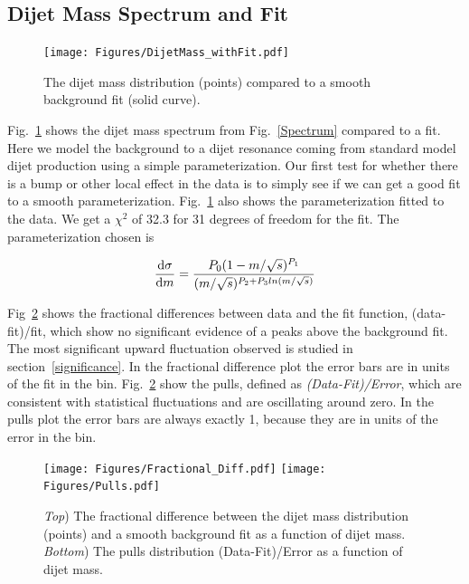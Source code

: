 \subsection{Dijet Mass Spectrum and Fit}


\begin{figure}[!ht]
  \begin{center}
   \texttt{[image: Figures/DijetMass\_withFit.pdf]}
    \caption{The dijet mass distribution (points) compared to a smooth background fit (solid
curve). }
    \label{Fit}
  \end{center}
\end{figure}


Fig.~\ref{Fit} shows the dijet mass spectrum from Fig.~\ref{Spectrum} compared to
a fit. Here we model the background to a dijet resonance coming from standard model dijet production
using a simple parameterization. Our first test for whether there is a bump or other local
effect in the data is to simply see if we can get a good fit to a smooth parameterization.
Fig.~\ref{Fit} also shows the parameterization fitted to the data. We get a $\chi^2$ of 32.3 
for 31 degrees of freedom for the fit.  The parameterization chosen is~\cite{Aaltonen:2008dn,ATLAS_Search} 


\begin{equation}
\frac{{\rm d}\sigma}{{\rm d}m} = 
\frac{P_{0} (1 - m/\sqrt{s})^{P_{1}}}{(m/\sqrt{s})^{P_{2} + P_{3} ln
(m/\sqrt{s})}}
\label{eqParam}
\end{equation}

Fig~\ref{FracDiff} shows the fractional differences between data and the fit function, (data-fit)/fit, which show no significant evidence 
of a peaks above the background fit. The most significant upward fluctuation observed is studied in section~\ref{significance}. 
In the fractional difference plot the error bars are in units of the fit in the bin.
Fig.~\ref{FracDiff} show the pulls, defined as \textit {(Data-Fit)/Error}, which are consistent with statistical fluctuations and 
are oscillating around zero. In the pulls plot the error bars are always exactly 1, because they are in units of the error in the bin.

\begin{figure}[!ht]
  \begin{center}
        \texttt{[image: Figures/Fractional\_Diff.pdf]}
    \texttt{[image: Figures/Pulls.pdf]}
    \caption{ \textit{Top})
The fractional difference between the dijet mass distribution (points) and a smooth
background fit as a function of dijet mass. \textit{Bottom}) The pulls distribution (Data-Fit)/Error as a function of dijet mass.}
    \label{FracDiff}
  \end{center}
\end{figure}
\clearpage
